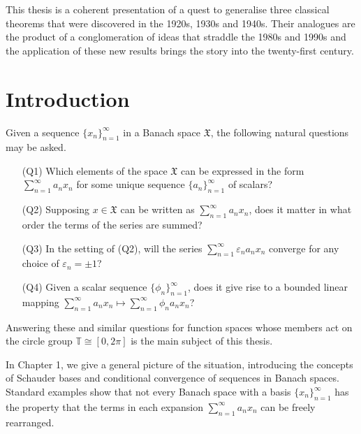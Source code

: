 \documentclass[honours,12pt]{unswthesis}
\newcommand{\T}{\mathbb{T}}
\newcommand{\X}{\mathfrak{X}}
\newcommand\blankpage{%
    \null
    \thispagestyle{empty}%
    \addtocounter{page}{-1}%
    \newpage}
\numberwithin{equation}{section}
\begin{document}


This thesis is a coherent presentation of a quest to generalise three classical
theorems that were discovered in the 1920s, 1930s and 1940s. Their analogues are
the product of a conglomeration of ideas that straddle the 1980s and 1990s and
the application of these new results brings the story into the twenty-first
century.
\afterpage{\blankpage}


\afterpreface

%
%

\afterpage{\blankpage}

\chapter{Introduction}\label{s-intro}


{\noindent}Given a sequence $\{x_n\}_{n=1}^{\infty}$ in a Banach space $\X$,
the following natural questions may be asked.
\begin{enumerate}
\item[(Q1)] Which elements of the space $\X$ can be expressed in the form
$\sum_{n=1}^{\infty}a_nx_n$ for some unique sequence $\{a_n\}_{n=1}^{\infty}$
of scalars?

\item[(Q2)] Supposing $x\in\X$ can be written as $\sum_{n=1}^{\infty}a_nx_n$,
does it matter in what order the terms of the series are summed?

\item[(Q3)] In the setting of (Q2), will the series
$\sum_{n=1}^{\infty}\varepsilon_na_nx_n$ converge for any choice of
$\varepsilon_n=\pm 1$?

\item[(Q4)] Given a scalar sequence $\{\phi_n\}_{n=1}^{\infty}$, does it give
rise to a bounded linear mapping
$\sum_{n=1}^{\infty}a_nx_n\mapsto\sum_{n=1}^{\infty}\phi_na_nx_n$?
\end{enumerate}

{\noindent}Answering these and similar questions for
function spaces whose members act on the circle group $\T\cong[0,2\pi]$
is the main subject of this thesis.

In Chapter 1, we give a general picture of the situation, introducing the
concepts of Schauder bases and conditional convergence of sequences in Banach
spaces. Standard examples show that not every Banach space with a basis
$\{x_n\}_{n=1}^{\infty}$ has the property that the terms in each expansion 
$\sum_{n=1}^{\infty}a_nx_n$ can be freely rearranged.
\end{document}
